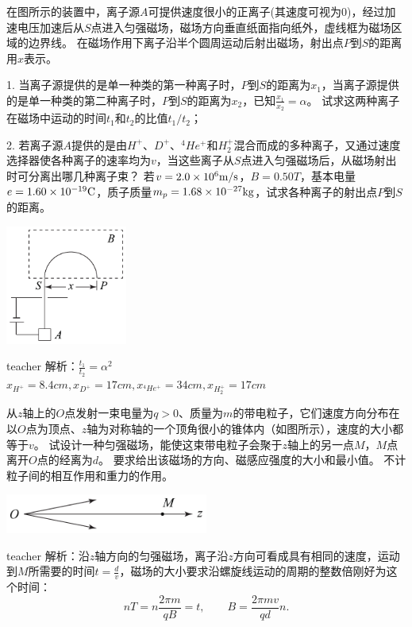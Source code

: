 \newpage
\begin{example}
在图所示的装置中，离子源$A$可提供速度很小的正离子(其速度可视为0)，经过加速电压加速后从$S$点进入匀强磁场，磁场方向垂直纸面指向纸外，虚线框为磁场区域的边界线。
在磁场作用下离子沿半个圆周运动后射出磁场，射出点$P$到$S$的距离用$x$表示。

1. 当离子源提供的是单一种类的第一种离子时，$P$到$S$的距离为$x_1$，当离子源提供的是单一种类的第二种离子时，$P$到$S$的距离为$x_2$，已知$\frac{x_1}{x_2} = \alpha$。
试求这两种离子在磁场中运动的时间$t_1$和$t_2$的比值$t_1/t_2$；

2. 若离子源$A$提供的是由$H^+$、$D^+$、$^4He^+$和$H_2^+$混合而成的多种离子，又通过速度选择器使各种离子的速率均为$v$，当这些离子从$S$点进入匀强磁场后，从磁场射出时可分离出哪几种离子束？
若$v = 2.0\times 10^{6}{\rm{m/s}}$，$B = 0.50\unit{T}$，基本电量$e = 1.60\times 10^{-19}{\rm{C}}$，质子质量$m_p = 1.68\times 10^{-27}{\rm{kg}}$，试求各种离子的射出点$P$到$S$的距离。
\begin{flushright}
\includegraphics[width = 0.3\textwidth]{images/mag-30.pdf} 
\end{flushright}
\begin{taggedblock}{teacher}
\noindent
解析：$\frac{t_1}{t_2}=\alpha^2$
\\$x_{H^+}=8.4cm,x_{D^+}=17cm,x_{^4He^+}=34cm,x_{H_2^+}=17cm$
\end{taggedblock}
\end{example}


\begin{example}
从$z$轴上的$O$点发射一束电量为$q>0$、质量为$m$的带电粒子，它们速度方向分布在以$O$点为顶点、$z$轴为对称轴的一个顶角很小的锥体内（如图所示），速度的大小都等于$v$。
试设计一种匀强磁场，能使这束带电粒子会聚于$z$轴上的另一点$M$，$M$点离开$O$点的经离为$d$。
要求给出该磁场的方向、磁感应强度的大小和最小值。
不计粒子间的相互作用和重力的作用。
\begin{flushright}
\includegraphics[width = 0.5\textwidth]{images/mag-31.pdf} 
\end{flushright}

\begin{taggedblock}{teacher}
\noindent
解析：沿$z$轴方向的匀强磁场，离子沿$z$方向可看成具有相同的速度，运动到$M$所需要的时间$t = \frac{d}{v}$，磁场的大小要求沿螺旋线运动的周期的整数倍刚好为这个时间：
\[
nT = n\frac{2\pi m}{qB} = t,\qquad B = \frac{2\pi mv}{qd}n.
\]
\end{taggedblock}
\end{example}




